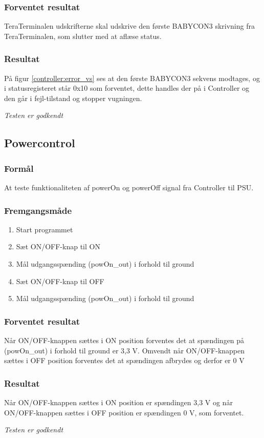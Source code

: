 \subsubsection*{Forventet resultat} 
TeraTerminalen udskrifterne skal udskrive den første BABYCON3 skrivning fra TeraTerminalen, som slutter med at aflæse status. 

\subsubsection*{Resultat} 
På figur \ref{controller:error_vs} ses at den første BABYCON3 sekvens modtages, og i statusregisteret står 0x10 som forventet, dette handles der på i Controller og den går i fejl-tilstand og stopper vugningen.  


\textit{Testen er godkendt}

\subsection*{Powercontrol}

\subsubsection*{Formål}
At teste funktionaliteten af powerOn og powerOff signal fra Controller til PSU.

\subsubsection*{Fremgangsmåde}
\begin{enumerate}
\item Start programmet
\item Sæt ON/OFF-knap til ON
\item Mål udgangsspænding (powOn\_out) i forhold til ground
\item Sæt ON/OFF-knap til OFF
\item Mål udgangsspænding (powOn\_out) i forhold til ground

\end{enumerate}

\subsubsection*{Forventet resultat}
Når ON/OFF-knappen sættes i ON position forventes det at spændingen på (powOn\_out) i forhold til ground er 3,3 V. Omvendt når ON/OFF-knappen sættes i OFF position forventes det at spændingen afbrydes og derfor er 0 V

\subsubsection*{Resultat} 
Når ON/OFF-knappen sættes i ON position er spændingen 3,3 V og når ON/OFF-knappen sættes i OFF position er spændingen 0 V, som forventet.

\textit{Testen er godkendt}